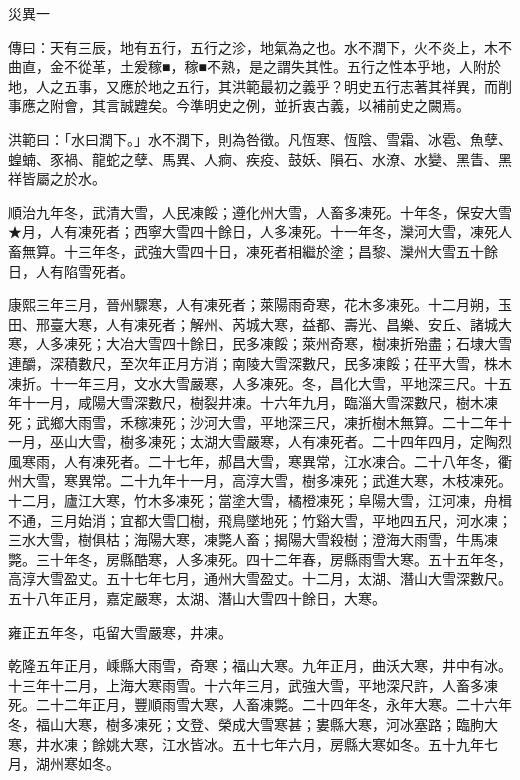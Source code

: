 
\begin{pinyinscope}
災異一

傳曰：天有三辰，地有五行，五行之沴，地氣為之也。水不潤下，火不炎上，木不曲直，金不從革，土爰稼■，稼■不熟，是之謂失其性。五行之性本乎地，人附於地，人之五事，又應於地之五行，其洪範最初之義乎？明史五行志著其祥異，而削事應之附會，其言誠韙矣。今準明史之例，並折衷古義，以補前史之闕焉。

洪範曰：「水曰潤下。」水不潤下，則為咎徵。凡恆寒、恆陰、雪霜、冰雹、魚孽、蝗蝻、豕禍、龍蛇之孽、馬異、人痾、疾疫、鼓妖、隕石、水潦、水變、黑眚、黑祥皆屬之於水。

順治九年冬，武清大雪，人民凍餒；遵化州大雪，人畜多凍死。十年冬，保安大雪★月，人有凍死者；西寧大雪四十餘日，人多凍死。十一年冬，灤河大雪，凍死人畜無算。十三年冬，武強大雪四十日，凍死者相繼於塗；昌黎、灤州大雪五十餘日，人有陷雪死者。

康熙三年三月，晉州驟寒，人有凍死者；萊陽雨奇寒，花木多凍死。十二月朔，玉田、邢臺大寒，人有凍死者；解州、芮城大寒，益都、壽光、昌樂、安丘、諸城大寒，人多凍死；大冶大雪四十餘日，民多凍餒；萊州奇寒，樹凍折殆盡；石埭大雪連釂，深積數尺，至次年正月方消；南陵大雪深數尺，民多凍餒；茌平大雪，株木凍折。十一年三月，文水大雪嚴寒，人多凍死。冬，昌化大雪，平地深三尺。十五年十一月，咸陽大雪深數尺，樹裂井凍。十六年九月，臨淄大雪深數尺，樹木凍死；武鄉大雨雪，禾稼凍死；沙河大雪，平地深三尺，凍折樹木無算。二十二年十一月，巫山大雪，樹多凍死；太湖大雪嚴寒，人有凍死者。二十四年四月，定陶烈風寒雨，人有凍死者。二十七年，郝昌大雪，寒異常，江水凍合。二十八年冬，衢州大雪，寒異常。二十九年十一月，高淳大雪，樹多凍死；武進大寒，木枝凍死。十二月，廬江大寒，竹木多凍死；當塗大雪，橘橙凍死；阜陽大雪，江河凍，舟楫不通，三月始消；宜都大雪囗樹，飛鳥墜地死；竹谿大雪，平地四五尺，河水凍；三水大雪，樹俱枯；海陽大寒，凍斃人畜；揭陽大雪殺樹；澄海大雨雪，牛馬凍斃。三十年冬，房縣酷寒，人多凍死。四十二年春，房縣雨雪大寒。五十五年冬，高淳大雪盈丈。五十七年七月，通州大雪盈丈。十二月，太湖、潛山大雪深數尺。五十八年正月，嘉定嚴寒，太湖、潛山大雪四十餘日，大寒。

雍正五年冬，屯留大雪嚴寒，井凍。

乾隆五年正月，嵊縣大雨雪，奇寒；福山大寒。九年正月，曲沃大寒，井中有冰。十三年十二月，上海大寒雨雪。十六年三月，武強大雪，平地深尺許，人畜多凍死。二十二年正月，豐順雨雪大寒，人畜凍斃。二十四年冬，永年大寒。二十六年冬，福山大寒，樹多凍死；文登、榮成大雪寒甚；婁縣大寒，河冰塞路；臨朐大寒，井水凍；餘姚大寒，江水皆冰。五十七年六月，房縣大寒如冬。五十九年七月，湖州寒如冬。


\end{pinyinscope}
